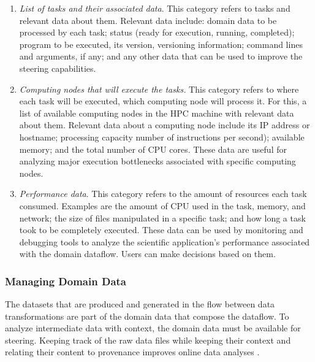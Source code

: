 \begin{enumerate}[label=(\roman*),itemsep=0pt]

\item \textit{List of tasks and their associated data}. This category
refers to tasks and relevant data about them. Relevant data include: domain data to be
processed by each task; status (ready for execution, running,
completed); program to be executed, its version, versioning information; command lines and arguments,
if any; and any other data that can be used to improve the steering capabilities.

\item \textit{Computing nodes that will execute the tasks.} This category refers to where each task will be executed,
\ie{} which computing node will process it. For this, a list of
available computing nodes in the HPC machine with relevant data about
them. Relevant data about a computing node
include its IP address or hostname; processing capacity
\eg{} number of instructions per second); available memory; and
the total number of CPU cores. These data are useful for analyzing major execution bottlenecks associated with specific computing nodes.

\item \textit{Performance data}. This category refers to the
amount of resources each task consumed. Examples are the amount of CPU used in the task,
memory, and network; the size of files manipulated in a specific task; and
how long a task took to be completely executed. These data can be
used by monitoring and debugging tools to analyze the scientific
application's performance associated with the domain dataflow. Users can make decisions based on them.

\end{enumerate}

\subsubsection{Managing Domain Data}

The datasets that are produced and generated in the flow between data transformations are part of the domain data that compose the dataflow. To analyze intermediate data with context, the domain data must be available for steering. Keeping track of the raw data files while keeping their context and relating their content to provenance improves online data analyses \cite{Silva2017Raw}.

